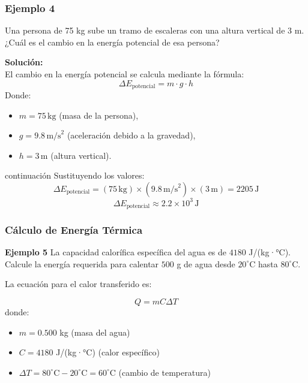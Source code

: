 \documentclass[main.tex]{subfiles}
\begin{document}
\begin{frame}[t] %
    \frametitle{Ejemplo 4}
    Una persona de 75 kg sube un tramo de escaleras con una altura vertical de 3 m. ¿Cuál es el cambio en la energía potencial de esa persona?

    \pause %

    \textbf{Solución:} \\
    El cambio en la energía potencial se calcula mediante la fórmula: \\
    \[
    \Delta E_{\text{potencial}} = m \cdot g \cdot h
    \]
    Donde:
    \begin{itemize}
        \item \( m = 75 \, \text{kg} \) (masa de la persona),
        \item \( g = 9.8 \, \text{m/s}^2 \) (aceleración debido a la gravedad),
        \item \( h = 3 \, \text{m} \) (altura vertical).
    \end{itemize}
\end{frame}

\begin{frame}{continuación}
     Sustituyendo los valores: \\
    \[
    \Delta E_{\text{potencial}} = (75 \, \text{kg}) \times (9.8 \, \text{m/s}^2) \times (3 \, \text{m}) = 2205 \, \text{J}
    \]
    \[
    \Delta E_{\text{potencial}} \approx 2.2 \times 10^3 \, \text{J}
    \]

\end{frame}
   

\begin{frame}[t] %
    \frametitle{Cálculo de Energía Térmica}

    \textbf{Ejemplo 5}  
    La capacidad calorífica específica del agua es de $4180$ J/(kg·°C).  
    Calcule la energía requerida para calentar $500$ g de agua desde $20^\circ$C hasta $80^\circ$C.

    \vspace{0.2cm}
    La ecuación para el calor transferido es:

    \[
    Q = m C \Delta T
    \]
 \pause %
    donde:
    \begin{itemize}
        \item $m = 0.500$ kg (masa del agua)
        \item $C = 4180$ J/(kg·°C) (calor específico)
        \item $\Delta T = 80^\circ \text{C} - 20^\circ \text{C} = 60^\circ \text{C}$ (cambio de temperatura)
    \end{itemize}
\end{frame}
\end{document}
